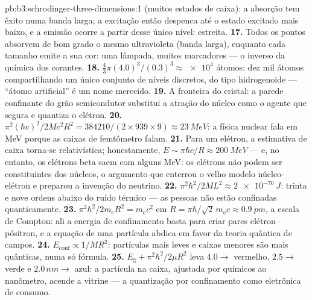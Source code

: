 \begin{solution}{pb:b3:schrodinger-three-dimensions:1}
(muitos estados de caixa): a absorção tem êxito numa banda larga; a
excitação então despenca até o estado excitado mais baixo, e a emissão
ocorre a partir desse único nível: estreita.
\textbf{17.} Todos os pontos absorvem de bom grado o mesmo ultravioleta
(banda larga), enquanto cada tamanho emite a sua cor: uma lâmpada,
muitos marcadores --- o inverso da química dos corantes.
\textbf{18.} $\tfrac43\pi(4.0)^3/(0.3)^3 \approx \num{e4}$ átomos: dez
mil átomos compartilhando um único conjunto de níveis discretos, do
tipo hidrogenoide --- ``átomo artificial'' é um nome merecido.
\textbf{19.} A fronteira do cristal: a parede confinante do grão
semicondutor substitui a atração do núcleo como o agente que segura e
quantiza o elétron.
\textbf{20.} $\pi^2(\hbar c)^2/2Mc^2R^2 = 384210/(2 \times 939
\times 9) \approx \qty{23}{MeV}$: a física nuclear fala em MeV porque
as caixas de femtômetro falam.
\textbf{21.} Para um elétron, a estimativa de caixa torna-se
relativística; honestamente, $E \sim \pi\hbar c/R \approx \qty{200}{MeV}$
--- e, no entanto, os elétrons beta saem com alguns MeV: os elétrons não podem ser constituintes dos núcleos, o argumento
que enterrou o velho modelo núcleo-elétron e preparou a invenção do
neutrino.
\textbf{22.} $\pi^2\hbar^2/2ML^2 \approx \qty{2e-70}{J}$: trinta e
nove ordens abaixo do ruído térmico --- as pessoas não estão
confinadas quanticamente.
\textbf{23.} $\pi^2\hbar^2/2m_{\text{e}}R^2 = m_{\text{e}}c^2$ em
$R = \pi\hbar/\sqrt2\,m_{\text{e}}c \approx \qty{0.9}{pm}$, a escala de
Compton: ali a energia de confinamento basta para criar pares
elétron--pósitron, e a equação de uma partícula abdica em favor da
teoria quântica de campos.
\textbf{24.} $E_{\text{conf}} \propto 1/MR^2$: partículas mais leves e
caixas menores são mais quânticas, numa só fórmula.
\textbf{25.} $E_{\text{g}} + \pi^2\hbar^2/2\mu R^2$ leva $4.0 \to$
vermelho, $2.5 \to$ verde e $2.0\,\unit{nm} \to$ azul: a partícula na
caixa, ajustada por químicos ao nanômetro, acende a vitrine --- a
quantização por confinamento como eletrônica de consumo.
\end{solution}
